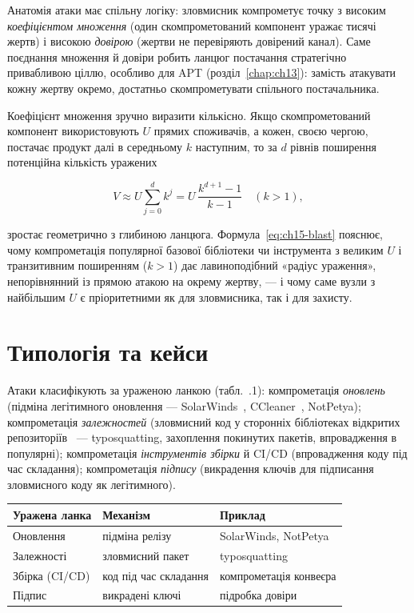 Анатомія атаки має спільну логіку: зловмисник компрометує точку з високим \emph{коефіцієнтом множення} (один скомпрометований компонент уражає тисячі жертв) і високою \emph{довірою} (жертви не перевіряють довірений канал). Саме поєднання множення й довіри робить ланцюг постачання стратегічно привабливою ціллю, особливо для APT (розділ~\ref{chap:ch13}): замість атакувати кожну жертву окремо, достатньо скомпрометувати спільного постачальника.

Коефіцієнт множення зручно виразити кількісно. Якщо скомпрометований компонент використовують $U$ прямих споживачів, а кожен, своєю чергою, постачає продукт далі в середньому $k$ наступним, то за $d$ рівнів поширення потенційна кількість уражених

\begin{equation}
V \approx U\sum_{j=0}^{d} k^{j} = U\,\frac{k^{d+1}-1}{k-1}\quad (k>1),
\label{eq:ch15-blast}
\end{equation}

зростає геометрично з глибиною ланцюга. Формула~\eqref{eq:ch15-blast} пояснює, чому компрометація популярної базової бібліотеки чи інструмента з великим $U$ і транзитивним поширенням ($k>1$) дає лавиноподібний «радіус ураження», непорівнянний із прямою атакою на окрему жертву, --- і чому саме вузли з найбільшим $U$ є пріоритетними як для зловмисника, так і для захисту.

\section{Типологія та кейси}\label{sec:ch15-typology}

Атаки класифікують за ураженою ланкою (табл.~\thechapter.1): компрометація \emph{оновлень} (підміна легітимного оновлення --- SolarWinds~\cite{ch15:solarwinds}, CCleaner~\cite{ch15:ccleaner}, NotPetya); компрометація \emph{залежностей} (зловмисний код у сторонніх бібліотеках відкритих репозиторіїв~\cite{ch15:ohm} --- typosquatting, захоплення покинутих пакетів, впровадження в популярні); компрометація \emph{інструментів збірки} й CI/CD (впровадження коду під час складання); компрометація \emph{підпису} (викрадення ключів для підписання зловмисного коду як легітимного).


\begin{center}\footnotesize
\begin{tabularx}{\linewidth}{L{22mm} Y L{20mm}}
\toprule
Уражена ланка & Механізм & Приклад \\
\midrule
Оновлення & підміна релізу & SolarWinds, NotPetya \\
Залежності & зловмисний пакет & typosquatting \\
Збірка (CI/CD) & код під час складання & компрометація конвеєра \\
Підпис & викрадені ключі & підробка довіри \\
\bottomrule
\end{tabularx}
\end{center}

